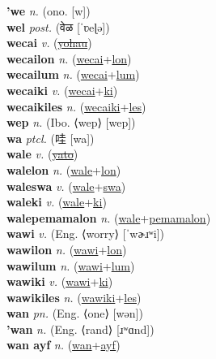 \textbf{'we} \textit{n.} (ono. [w])
 \label{'we} \\
\textbf{wel} \textit{post.} ({\devanagari{}वेळ} [ˈʋeɭə])
 \label{wel} \\
\textbf{wecai} \textit{v.} (\hyperref[yohau]{\sout{yohau}})
 \label{wecai} \\
\textbf{wecailon} \textit{n.} (\hyperref[wecai]{wecai}+\hyperref[lon]{lon})
 \label{wecailon} \\
\textbf{wecailum} \textit{n.} (\hyperref[wecai]{wecai}+\hyperref[lum]{lum})
 \label{wecailum} \\
\textbf{wecaiki} \textit{v.} (\hyperref[wecai]{wecai}+\hyperref[ki]{ki})
 \label{wecaiki} \\
\textbf{wecaikiles} \textit{n.} (\hyperref[wecaiki]{wecaiki}+\hyperref[les]{les})
 \label{wecaikiles} \\
\textbf{wep} \textit{n.} (Ibo. ⟨wep⟩ [wep])
 \label{wep} \\
\textbf{wa} \textit{ptcl.} ({\chinese{}哇} [wa])
 \label{wa} \\
\textbf{wale} \textit{v.} (\hyperref[yato]{\sout{yato}})
 \label{wale} \\
\textbf{walelon} \textit{n.} (\hyperref[wale]{wale}+\hyperref[lon]{lon})
 \label{walelon} \\
\textbf{waleswa} \textit{v.} (\hyperref[wale]{wale}+\hyperref[swa]{swa})
 \label{waleswa} \\
\textbf{waleki} \textit{v.} (\hyperref[wale]{wale}+\hyperref[ki]{ki})
 \label{waleki} \\
\textbf{walepemamalon} \textit{n.} (\hyperref[wale]{wale}+\hyperref[pemamalon]{pemamalon})
 \label{walepemamalon} \\
\textbf{wawi} \textit{v.} (Eng. ⟨worry⟩ [ˈwɚɹʷi])
 \label{wawi} \\
\textbf{wawilon} \textit{n.} (\hyperref[wawi]{wawi}+\hyperref[lon]{lon})
 \label{wawilon} \\
\textbf{wawilum} \textit{n.} (\hyperref[wawi]{wawi}+\hyperref[lum]{lum})
 \label{wawilum} \\
\textbf{wawiki} \textit{v.} (\hyperref[wawi]{wawi}+\hyperref[ki]{ki})
 \label{wawiki} \\
\textbf{wawikiles} \textit{n.} (\hyperref[wawiki]{wawiki}+\hyperref[les]{les})
 \label{wawikiles} \\
\textbf{wan} \textit{pn.} (Eng. ⟨one⟩ [wən])
 \label{wan} \\
\textbf{'wan} \textit{n.} (Eng. ⟨rand⟩ [ɹʷɑnd])
 \label{'wan} \\
\textbf{wan ayf} \textit{n.} (\hyperref[wan]{wan}+\hyperref[ayf]{ayf})
